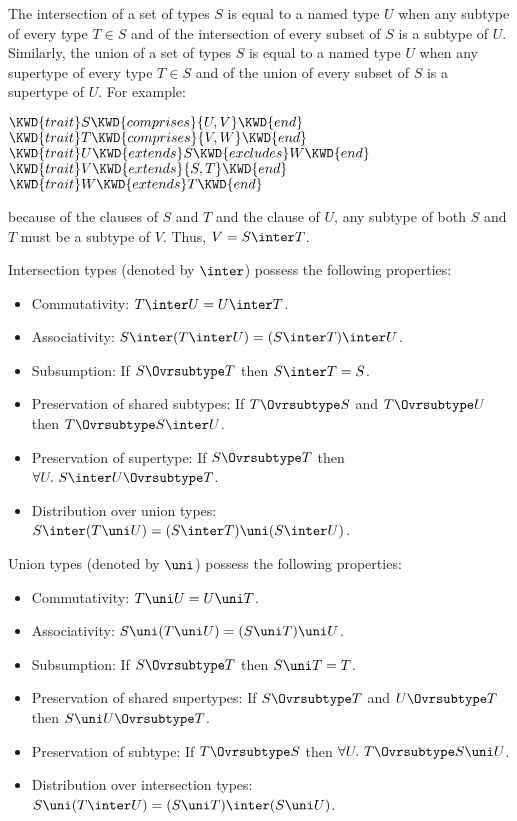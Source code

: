 The intersection of a set of types $S$ is equal to a named type $U$ when
any subtype of every type $T \in S$ and of the intersection of every
subset of $S$ is a subtype of $U$.
Similarly, the union of a set of types $S$ is equal to a named type $U$ when
any supertype of every type $T \in S$ and of the union of every
subset of $S$ is a supertype of $U$.
For example:
\begin{Fortress}
\(\KWD{trait} S \KWD{comprises} \{U,V\} \KWD{end}\)\\
\(\KWD{trait} T \KWD{comprises} \{V,W\} \KWD{end}\)\\
\(\KWD{trait} U \KWD{extends} S \KWD{excludes} W \KWD{end}\)\\
\(\KWD{trait} V \KWD{extends} \{S,T\} \KWD{end}\)\\
\(\KWD{trait} W \KWD{extends} T \KWD{end}\)
\end{Fortress}
because of the  clauses of $S$ and $T$ and the 
clause of $U$, any subtype of both $S$ and $T$ must be a subtype of
$V$.  Thus, $V = S \inter T$.


Intersection types (denoted by $\inter$) possess the following properties:
\begin{itemize}
\item Commutativity: $T \inter U = U \inter T$.
\item Associativity: $S \inter (T \inter U) = (S \inter T) \inter U$.
\item Subsumption: If $S \Ovrsubtype T$ then $S \inter T = S$.
\item Preservation of shared subtypes: If $T \Ovrsubtype S$ and $T \Ovrsubtype U$ then $T \Ovrsubtype S \inter U$.
\item Preservation of supertype: If $S \Ovrsubtype T$ then $\forall U.~S \inter U \Ovrsubtype T$.
\item Distribution over union types: $S \inter (T \uni U) =
  (S \inter T) \uni (S \inter U)$.
\end{itemize}

Union types (denoted by $\uni$) possess the following properties:
\begin{itemize}
\item Commutativity: $T \uni U = U \uni T$.
\item Associativity: $S \uni (T \uni U) = (S \uni T) \uni U$.
\item Subsumption: If $S \Ovrsubtype T$ then $S \uni T = T$.
\item Preservation of shared supertypes: If $S \Ovrsubtype T$ and $U \Ovrsubtype T$ then $S \uni U \Ovrsubtype T$.
\item Preservation of subtype: If $T \Ovrsubtype S$ then $\forall U.~T \Ovrsubtype S \uni U$.
\item Distribution over intersection types: $S \uni (T \inter U)
  = (S \uni T) \inter (S \uni U)$.
\end{itemize}



